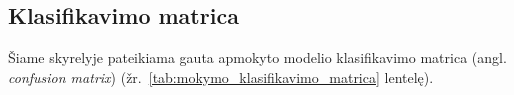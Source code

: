 \subsection{Klasifikavimo matrica}
\label{subsec:mokymo_klasifikavimo_matrica}

Šiame skyrelyje pateikiama gauta apmokyto modelio klasifikavimo matrica (angl. \textit{confusion matrix}) (žr.~\ref{tab:mokymo_klasifikavimo_matrica} lentelę).

